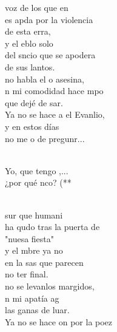 \begin{cancion}%
	 voz de los que en\\
	es apda por la violencia \\
	de esta erra,\\
	y el eblo solo \\
	del sncio que se apodera \\
	de sus lantos.\\
\jump
	no habla el o asesina,\\
	n mi comodidad hace mpo \\
	que dejé de sar.\\
	Ya no se hace a el Evanlio, \\
y en estos días \\
	no me o de pregunr...\\\jump\\
	\begin{chorus}%
	Yo, que tengo ,...  \\
	¿por qué nco? (** \\
	\end{chorus}%
	\jump\\
	 sur que humani\\
	ha qudo tras la puerta de \\
	"nuesa fiesta"\\
	y el mbre ya no \\
	en la sas que parecen \\
	no ter final.\\
\jump
	no se levanlos margidos,\\
	n mi apatía ag  \\
	las ganas de luar.\\
	Ya no se hace on por la poez\\

\end{cancion}

